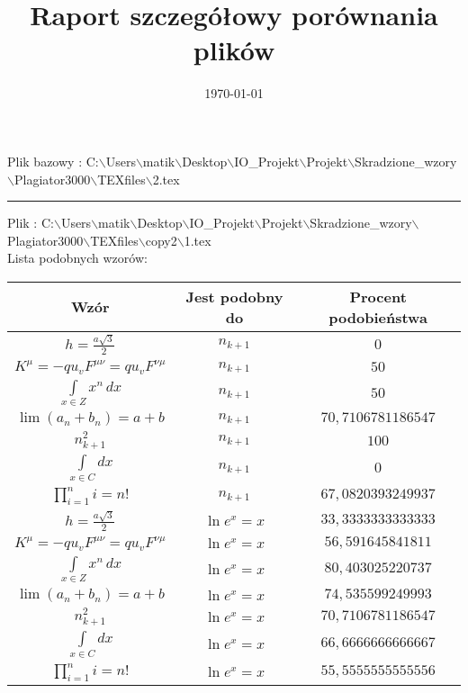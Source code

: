 \documentclass{article}
\begin{document}
\title{\huge\bfseries Raport szczegółowy porównania plików }
\date{\today}
\maketitle
\begin{flushleft}
Plik bazowy : C:$\backslash$Users$\backslash$matik$\backslash$Desktop$\backslash$IO\_Projekt$\backslash$Projekt$\backslash$Skradzione\_wzory$\backslash$Plagiator3000$\backslash$TEXfiles$\backslash$2.tex
\end{flushleft}
\hrule
\begin{flushleft}
Plik : C:$\backslash$Users$\backslash$matik$\backslash$Desktop$\backslash$IO\_Projekt$\backslash$Projekt$\backslash$Skradzione\_wzory$\backslash$Plagiator3000$\backslash$TEXfiles$\backslash$copy2$\backslash$1.tex\\ 
Lista podobnych wzorów: \\ 
\begin{longtable}{|c|c|c|} 
 \hline 
 Wzór & Jest podobny do & Procent podobieństwa \\ \hline  
$h=\frac{a\sqrt{3}}{2}$ & $n_{k+1}$ & $0$ \\ \hline 
$K^\mu=-qu_vF^{\mu\nu}=qu_vF^{\nu\mu}$ & $n_{k+1}$ & $50$ \\ \hline 
$\int \limits_{x\in Z}\!x^{n}\,dx$ & $n_{k+1}$ & $50$ \\ \hline 
$\lim\left(a_n+b_n\right)=a+b$ & $n_{k+1}$ & $70,7106781186547$ \\ \hline 
$n_{k+1}^2$ & $n_{k+1}$ & $100$ \\ \hline 
$\int \limits_{x\in C}dx$ & $n_{k+1}$ & $0$ \\ \hline 
$\prod_{i=1}^ni=n!$ & $n_{k+1}$ & $67,0820393249937$ \\ \hline 
$h=\frac{a\sqrt{3}}{2}$ & $\ln e^x=x$ & $33,3333333333333$ \\ \hline 
$K^\mu=-qu_vF^{\mu\nu}=qu_vF^{\nu\mu}$ & $\ln e^x=x$ & $56,591645841811$ \\ \hline 
$\int \limits_{x\in Z}\!x^{n}\,dx$ & $\ln e^x=x$ & $80,403025220737$ \\ \hline 
$\lim\left(a_n+b_n\right)=a+b$ & $\ln e^x=x$ & $74,535599249993$ \\ \hline 
$n_{k+1}^2$ & $\ln e^x=x$ & $70,7106781186547$ \\ \hline 
$\int \limits_{x\in C}dx$ & $\ln e^x=x$ & $66,6666666666667$ \\ \hline 
$\prod_{i=1}^ni=n!$ & $\ln e^x=x$ & $55,5555555555556$ \\ \hline 

\end{longtable}
\end{flushleft}
\end{document}
